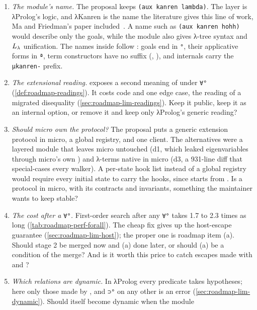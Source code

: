\begin{enumerate}
  \item \emph{The module's name.} The proposal keeps \texttt{(aux kanren lambda)}. The layer is λProlog's
    logic, and λKanren is the name the literature gives this line of work, Ma and Friedman's paper
    included~\cite{MaFriedman2021}. A name such as \texttt{(aux kanren hohh)} would describe only the
    goals, while the module also gives λ-tree syntax and $L_\lambda$ unification. The names inside follow
    \aux: goals end in \texttt{°}, their applicative forms in \texttt{ª}, term constructors have no
    suffix (, ), and internals carry the \texttt{μkanren-} prefix.
  \item \emph{The extensional reading.}  exposes a second meaning of
     under \texttt{∀°} (\cref{def:roadmap-readings}). It costs code and one edge case,
    the reading of a migrated disequality (\cref{sec:roadmap-lim-readings}). Keep it public, keep it as
    an internal option, or remove it and keep only λProlog's generic reading?
  \item \emph{Should micro own the protocol?} The proposal puts a generic extension protocol in micro,
    a global registry, and one client. The alternatives were a layered module that leaves micro untouched
    (d1, which leaked eigenvariables through micro's own ) and λ-terms native in micro (d3, a
    931-line diff that special-cases every walker). A per-state hook list instead of a global registry
    would require every initial state to carry the hooks, since  starts from
    . Is a protocol in micro, with its contracts and invariants, something the
    maintainer wants to keep stable?
  \item \emph{The cost after a \texttt{∀°}.} First-order search after any \texttt{∀°} takes 1.7 to 2.3
    times as long (\cref{tab:roadmap-perf-forall}). The cheap fix gives up the host-escape guarantee
    (\cref{sec:roadmap-lim-host}); the proper one is roadmap item (a). Should stage 2 be merged now and
    (a) done later, or should (a) be a condition of the merge? And is it worth this price to catch
    escapes made with  and ?
  \item \emph{Which relations are dynamic.} In λProlog every predicate takes hypotheses; here only those
    made by , and \texttt{⊃°} on any other is an error
    (\cref{sec:roadmap-lim-dynamic}). Should  itself become dynamic when the module

\end{enumerate}
